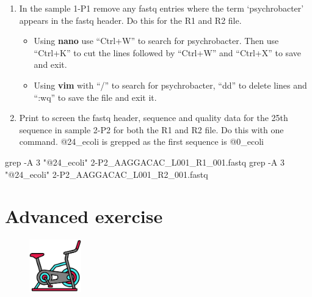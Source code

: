 \documentclass[
  letterpaper,
  DIV=11,
  numbers=noendperiod]{scrreprt}
\newenvironment{Shaded}{\begin{snugshade}}{\end{snugshade}}
\newcommand{\AttributeTok}[1]{\textcolor[rgb]{0.40,0.45,0.13}{#1}}
\newcommand{\FunctionTok}[1]{\textcolor[rgb]{0.28,0.35,0.67}{#1}}
\newcommand{\NormalTok}[1]{\textcolor[rgb]{0.00,0.23,0.31}{#1}}
\newcommand{\StringTok}[1]{\textcolor[rgb]{0.13,0.47,0.30}{#1}}
\providecommand{\tightlist}{%
  \setlength{\itemsep}{0pt}\setlength{\parskip}{0pt}}\usepackage{longtable,booktabs,array}
\begin{document}
\begin{enumerate}
\def\labelenumi{\arabic{enumi}.}
\setcounter{enumi}{9}
\tightlist
\item
  In the sample 1-P1 remove any fastq entries where the term
  `psychrobacter' appears in the fastq header. Do this for the R1 and R2
  file.

  \begin{itemize}
  \tightlist
  \item
    Using \textbf{nano} use ``Ctrl+W'' to search for psychrobacter. Then
    use ``Ctrl+K'' to cut the lines followed by ``Ctrl+W'' and
    ``Ctrl+X'' to save and exit.
  \item
    Using \textbf{vim} with ``/'' to search for psychrobacter, ``dd'' to
    delete lines and ``:wq'' to save the file and exit it.
  \end{itemize}
\item
  Print to screen the fastq header, sequence and quality data for the
  25th sequence in sample 2-P2 for both the R1 and R2 file. Do this with
  one command. @24\_ecoli is grepped as the first sequence is @0\_ecoli
\end{enumerate}

\begin{Shaded}
\begin{Highlighting}[]
\FunctionTok{grep} \AttributeTok{{-}A}\NormalTok{ 3 }\StringTok{"@24\_ecoli"}\NormalTok{ 2{-}P2\_AAGGACAC\_L001\_R1\_001.fastq}
\FunctionTok{grep} \AttributeTok{{-}A}\NormalTok{ 3 }\StringTok{"@24\_ecoli"}\NormalTok{ 2{-}P2\_AAGGACAC\_L001\_R2\_001.fastq}
\end{Highlighting}
\end{Shaded}

\hypertarget{exerciseadv_answers}{%
\chapter*{Advanced exercise}\label{exerciseadv_answers}}


\begin{figure}

{\centering \includegraphics[width=0.2\textwidth,height=\textheight]{figures/adv_exercise.png}

}

\end{figure}
\end{document}
